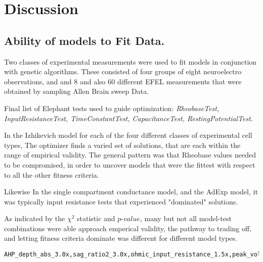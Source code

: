 \section{Discussion}

\subsection{Ability of models to Fit Data.}

Two classes of experimental measurements were used to fit models in conjunction with genetic algorithms. These consisted of four groups of eight neuroelectro observations, and and $8$ and also $60$ different EFEL measurements that were obtained by sampling Allen Brain sweep Data.


Final list of Elephant tests used to guide optimization: 
\emph{RheobaseTest, InputResistanceTest, TimeConstantTest, CapacitanceTest, RestingPotentialTest}.


In the Izhikevich model for each of the four different classes of experimental cell types, The optimizer finds a varied set of solutions, that are each within the range of empirical validity. The general pattern was that Rheobase values needed to be compromised, in order to uncover models that were the fittest with respect to all the other fitness criteria.

Likewise In the single compartment conductance model, and the AdExp model, it was typically input resistance tests that experienced "dominated" solutions. 

As indicated by the $\chi^{2}$ statistic and $p$-$value$, many but not all model-test combinations were able approach emperical validity, the pathway to trading off, and letting fitness criteria dominate was different for different model types.




\begin{verbatim}
AHP_depth_abs_3.0x,sag_ratio2_3.0x,ohmic_input_resistance_1.5x,peak_voltage_3.0x,voltage_base_3.0x,Spikecount_3.0x,ohmic_input_resistance_vb_ssse_1.5x. 
\end{verbatim}

